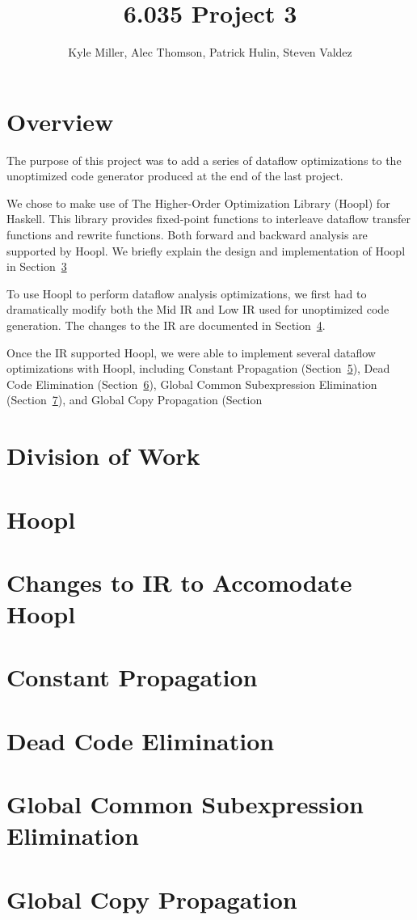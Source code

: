 \documentclass[11pt]{article}
\title{6.035 Project 3}
\author{Kyle Miller, Alec Thomson, Patrick Hulin, Steven Valdez}
\begin{document}
 
\maketitle


\section {Overview} 

The purpose of this project was to add a series of dataflow optimizations to the unoptimized code generator produced at the end of the last project. 

We chose to make use of The Higher-Order Optimization Library (Hoopl) for Haskell. This library provides fixed-point functions to interleave dataflow transfer functions and rewrite functions. Both forward and backward analysis are supported by Hoopl. We briefly explain the design and implementation of Hoopl in Section~\ref{sec:hoopl}

To use Hoopl to perform dataflow analysis optimizations, we first had to dramatically modify both the Mid IR and Low IR used for unoptimized code generation. The changes to the IR are documented in Section~\ref{sec:changes}. 

Once the IR supported Hoopl, we were able to implement several dataflow optimizations with Hoopl, including Constant Propagation (Section~\ref{sec:constprop}), Dead Code Elimination (Section~\ref{sec:deadcode}), Global Common Subexpression Elimination (Section~\ref{sec:cse}), and Global Copy Propagation (Section

\section {Division of Work} 
\label{sec:division} 

\section {Hoopl}
\label{sec:hoopl} 

\section {Changes to IR to Accomodate Hoopl}
\label{sec:changes} 

\section {Constant Propagation} 
\label{sec:constprop}

\section {Dead Code Elimination} 
\label{sec:deadcode}

\section {Global Common Subexpression Elimination} 
\label{sec:cse}

\section {Global Copy Propagation}
\label{copyprop}
\end{document}
